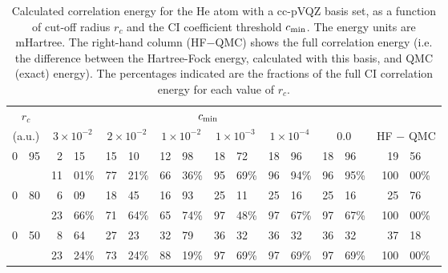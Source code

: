 \begin{table*}

\caption{Calculated correlation energy for the He atom with a 
cc-pVQZ basis set, as a function of cut-off radius $r_c$ 
and the CI coefficient threshold $c_{\rm min}$.
The energy units are mHartree. 
The right-hand column (HF$-$QMC) shows the full correlation energy
(i.e. the difference between the Hartree-Fock energy, calculated 
with this basis, and QMC (exact) energy).
The percentages indicated are the fractions of the full 
CI correlation energy for each value of $r_c$.
}

\begin{center}
\begin{tabular}{*{8}{r@{.}l}}
\multicolumn{2}{c}{$r_c$} & \multicolumn{12}{c}{$c_{\rm min}$} & \multicolumn{2}{c}{} \\
\multicolumn{2}{c}{(a.u.)} & \multicolumn{2}{c}{$3 \times 10^{-2}$} & \multicolumn{2}{c}{$2 \times 10^{-2}$} & \multicolumn{2}{c}{$1 \times 10^{-2}$} & \multicolumn{2}{c}{$1 \times 10^{-3}$} & \multicolumn{2}{c}{$1 \times 10^{-4}$} &     \multicolumn{2}{c}{0.0}  & \multicolumn{2}{c}{HF $-$ QMC} \\
\hline
                          0&95 &        2&15  &            15&10  &             12&98  &             18&72  &             18&96  &    18&96  & \hspace*{8mm} 19&56 \hspace*{8mm}  \\
\multicolumn{2}{c}{}           &       11&01\%&            77&21\%&            66&36\% &            95&69\% &            96&94\% &    96&95\%& 100&00\% \\

                          0&80 &        6&09  &            18&45  &             16&93  &             25&11  &             25&16  &    25&16  &  25&76   \\
\multicolumn{2}{c}{}           &       23&66\%&            71&64\%&            65&74\% &            97&48\% &             97&67\%&    97&67\%& 100&00\% \\

                          0&50 &        8&64  &            27&23  &            32&79  &             36&32  &             36&32  &     36&32  &  37&18   \\
\multicolumn{2}{c}{}           &       23&24\%&            73&24\%&            88&19\% &            97&69\% &            97&69\% &    97&69\%& 100&00\% \\


\end{tabular}
\end{center}
\end{table*}
